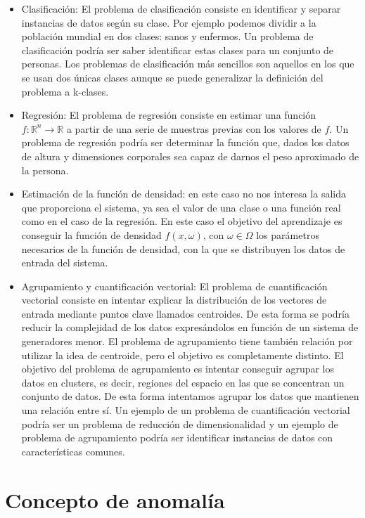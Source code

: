 \begin{itemize}
	\item Clasificación: El problema de clasificación consiste en identificar y separar instancias de datos según su clase. Por ejemplo podemos dividir a la población mundial en dos clases: sanos y enfermos. Un problema de clasificación podría ser saber identificar estas clases para un conjunto de personas. Los problemas de clasificación más sencillos son aquellos en los que se usan dos únicas clases aunque se puede generalizar la definición del problema a k-clases.
	\item Regresión: El problema de regresión consiste en estimar una función $f: \mathbb{R}^n \rightarrow \mathbb{R}$ a partir de una serie de muestras previas con los valores de $f$. Un problema de regresión podría ser determinar la función que, dados los datos de altura y dimensiones corporales sea capaz de darnos el peso aproximado de la persona.
	\item Estimación de la función de densidad: en este caso no nos interesa la salida que proporciona el sistema, ya sea el valor de una clase o una función real como en el caso de la regresión. En este caso el objetivo del aprendizaje es conseguir la función de densidad $f(x,\omega)$, con $\omega \in \Omega$ los parámetros necesarios de la función de densidad, con la que se distribuyen los datos de entrada del sistema.
	\item Agrupamiento y cuantificación vectorial: El problema de cuantificación vectorial consiste en intentar explicar la distribución de los vectores de entrada mediante puntos clave llamados centroides. De esta forma se podría reducir la complejidad de los datos expresándolos en función de un sistema de generadores menor. El problema de agrupamiento tiene también relación por utilizar la idea de centroide, pero el objetivo es completamente distinto. El objetivo del problema de agrupamiento es intentar conseguir agrupar los datos en clusters, es decir, regiones del espacio en las que se concentran un conjunto de datos. De esta forma intentamos agrupar los datos que mantienen una relación entre sí. Un ejemplo de un problema de cuantificación vectorial podría ser un problema de reducción de dimensionalidad y un ejemplo de problema de agrupamiento podría ser identificar instancias de datos con características comunes.
\end{itemize}

\chapter{Concepto de anomalía}
\label{chapter:anomalia}